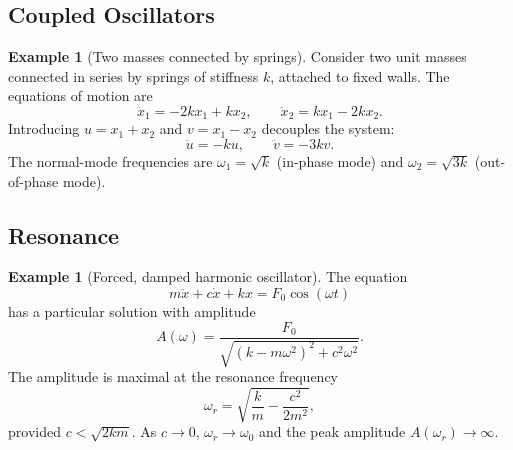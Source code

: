 \documentclass[12pt,a4paper,openany]{book}
\theoremstyle{definition}
\newtheorem{example}[definition]{Example}
\theoremstyle{plain}
\theoremstyle{remark}
\begin{document}
\subsection{Coupled Oscillators}
\label{subsec:coupled-oscillators}

\begin{example}[Two masses connected by springs]
\label{ex:coupled-springs}
Consider two unit masses connected in series by springs of stiffness
$k$, attached to fixed walls. The equations of motion are
\[
  \ddot{x}_{1} = -2kx_{1}+kx_{2}, \qquad
  \ddot{x}_{2} = kx_{1}-2kx_{2}.
\]
Introducing $u=x_{1}+x_{2}$ and $v=x_{1}-x_{2}$ decouples the
system:
\[
  \ddot{u}=-ku, \qquad \ddot{v}=-3kv.
\]
The normal-mode frequencies are $\omega_{1}=\sqrt{k}$ (in-phase mode)
and $\omega_{2}=\sqrt{3k}$ (out-of-phase mode).
\end{example}

\subsection{Resonance}
\label{subsec:resonance}

\begin{example}[Forced, damped harmonic oscillator]
\label{ex:resonance}
The equation
\[
  m\ddot{x} + c\dot{x} + kx = F_{0}\cos(\omega t)
\]
has a particular solution with amplitude
\[
  A(\omega) = \frac{F_{0}}{\sqrt{(k-m\omega^{2})^{2}+c^{2}\omega^{2}}}.
\]
The amplitude is maximal at the resonance frequency
\[
  \omega_{r} = \sqrt{\frac{k}{m}-\frac{c^{2}}{2m^{2}}},
\]
provided $c<\sqrt{2km}$. As $c\to 0$, $\omega_{r}\to\omega_{0}$ and
the peak amplitude $A(\omega_{r})\to\infty$.
\end{example}

\begin{center}
\end{center}
\end{document}
